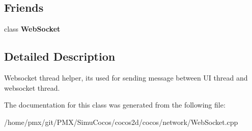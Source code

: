\subsection*{Friends}
\begin{DoxyCompactItemize}
\item 
\mbox{\label{classnetwork_1_1WsThreadHelper_aae91499d85b5a2d8fbe7c9439fe78fcf}} 
class {\bfseries Web\+Socket}
\end{DoxyCompactItemize}


\subsection{Detailed Description}
Websocket thread helper, it\textquotesingle{}s used for sending message between UI thread and websocket thread. 

The documentation for this class was generated from the following file\+:\begin{DoxyCompactItemize}
\item 
/home/pmx/git/\+P\+M\+X/\+Simu\+Cocos/cocos2d/cocos/network/Web\+Socket.\+cpp\end{DoxyCompactItemize}
